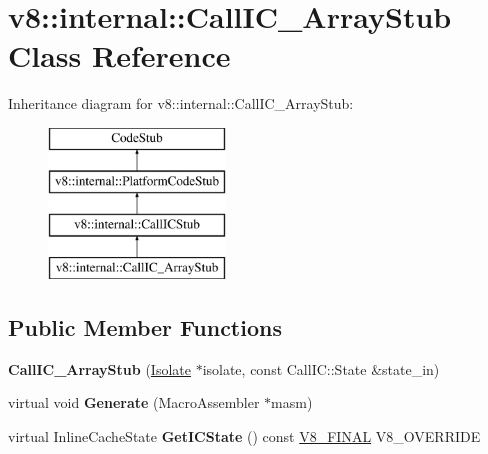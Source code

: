 \hypertarget{classv8_1_1internal_1_1_call_i_c___array_stub}{}\section{v8\+:\+:internal\+:\+:Call\+I\+C\+\_\+\+Array\+Stub Class Reference}
\label{classv8_1_1internal_1_1_call_i_c___array_stub}
Inheritance diagram for v8\+:\+:internal\+:\+:Call\+I\+C\+\_\+\+Array\+Stub\+:\begin{figure}[H]
\begin{center}
\leavevmode
\includegraphics[height=4.000000cm]{classv8_1_1internal_1_1_call_i_c___array_stub}
\end{center}
\end{figure}
\subsection*{Public Member Functions}
\begin{DoxyCompactItemize}
\item 
\hypertarget{classv8_1_1internal_1_1_call_i_c___array_stub_a715945a1510c83ae7fe95620cc3bcc17}{}{\bfseries Call\+I\+C\+\_\+\+Array\+Stub} (\hyperlink{classv8_1_1internal_1_1_isolate}{Isolate} $\ast$isolate, const Call\+I\+C\+::\+State \&state\+\_\+in)\label{classv8_1_1internal_1_1_call_i_c___array_stub_a715945a1510c83ae7fe95620cc3bcc17}

\item 
\hypertarget{classv8_1_1internal_1_1_call_i_c___array_stub_ab3d84baf42900d24993635e4afce7dd1}{}virtual void {\bfseries Generate} (Macro\+Assembler $\ast$masm)\label{classv8_1_1internal_1_1_call_i_c___array_stub_ab3d84baf42900d24993635e4afce7dd1}

\item 
\hypertarget{classv8_1_1internal_1_1_call_i_c___array_stub_a5750274e12120be8da061775afeaacf8}{}virtual Inline\+Cache\+State {\bfseries Get\+I\+C\+State} () const \hyperlink{classv8_1_1internal_1_1_v8___f_i_n_a_l}{V8\+\_\+\+F\+I\+N\+A\+L} V8\+\_\+\+O\+V\+E\+R\+R\+I\+D\+E\label{classv8_1_1internal_1_1_call_i_c___array_stub_a5750274e12120be8da061775afeaacf8}

\end{DoxyCompactItemize}
